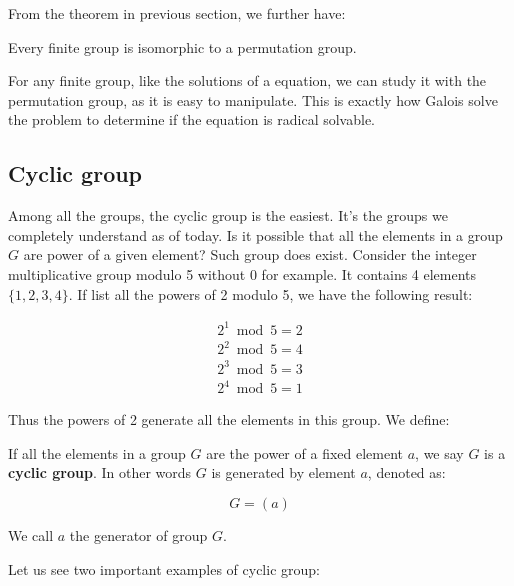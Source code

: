 \documentclass{article}
\begin{document}
From the theorem in previous section, we further have:

\begin{theorem}
Every finite group is isomorphic to a permutation group.
\end{theorem}

For any finite group, like the solutions of a equation, we can study it with the permutation group, as it is easy to manipulate. This is exactly how Galois solve the problem to determine if the equation is radical solvable.

\begin{Exercise}
\end{Exercise}

\subsection{Cyclic group}

Among all the groups, the cyclic group is the easiest. It's the groups we completely understand as of today. Is it possible that all the elements in a group $G$ are power of a given element? Such group does exist. Consider the integer multiplicative group modulo 5 without 0 for example. It contains 4 elements $\{1, 2, 3, 4\}$. If list all the powers of 2 modulo 5, we have the following result:

\[
\begin{array}{l}
2^1 \bmod 5 = 2 \\
2^2 \bmod 5 = 4 \\
2^3 \bmod 5 = 3 \\
2^4 \bmod 5 = 1
\end{array}
\]

Thus the powers of 2 generate all the elements in this group. We define:

\begin{definition}
If all the elements in a group $G$ are the power of a fixed element $a$, we say $G$ is a \textbf{cyclic group}. In other words $G$ is generated by element $a$, denoted as:

\[
G = (a)
\]

We call $a$ the generator of group $G$.
\end{definition}

Let us see two important examples of cyclic group:
\end{document}
